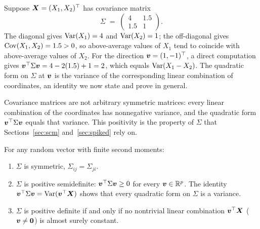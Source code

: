 \begin{example}\label{ex:cov-matrix-2d}
Suppose \(\bm{X} = (X_1, X_2)^{\top}\) has covariance matrix
\[
  \Sigma \;=\; \begin{pmatrix} 4 & 1.5 \\ 1.5 & 1 \end{pmatrix}.
\]
The diagonal gives \(\operatorname{Var}(X_1) = 4\) and \(\operatorname{Var}(X_2) = 1\); the off-diagonal gives \(\operatorname{Cov}(X_1, X_2) = 1.5 > 0\), so above-average values of \(X_1\) tend to coincide with above-average values of \(X_2\). For the direction \(\bm{v} = (1, -1)^{\top}\), a direct computation gives \(\bm{v}^{\top} \Sigma \bm{v} = 4 - 2(1.5) + 1 = 2\), which equals \(\operatorname{Var}(X_1 - X_2)\). The quadratic form on \(\Sigma\) at \(\bm{v}\) is the variance of the corresponding linear combination of coordinates, an identity we now state and prove in general.
\end{example}

Covariance matrices are not arbitrary symmetric matrices: every linear combination of the coordinates has nonnegative variance, and the quadratic form \(\bm{v}^{\top} \Sigma \bm{v}\) equals that variance. This positivity is the property of \(\Sigma\) that Sections~\ref{sec:scm} and~\ref{sec:spiked} rely on.

\begin{proposition}\label{prop:cov-psd}
For any random vector with finite second moments:
\begin{enumerate}[label=\textnormal{(\arabic*)},leftmargin=*]
  \item \(\Sigma\) is symmetric, \(\Sigma_{ij} = \Sigma_{ji}\).
  \item \(\Sigma\) is positive semidefinite: \(\bm{v}^{\top} \Sigma \bm{v} \ge 0\) for every \(\bm{v} \in \mathbb{R}^p\). The identity \(\bm{v}^{\top} \Sigma \bm{v} = \operatorname{Var}(\bm{v}^{\top} \bm{X})\) shows that every quadratic form on \(\Sigma\) is a variance.
  \item \(\Sigma\) is positive definite if and only if no nontrivial linear combination \(\bm{v}^{\top} \bm{X}\) (\(\bm{v} \ne \bm{0}\)) is almost surely constant.
\end{enumerate}
\end{proposition}

